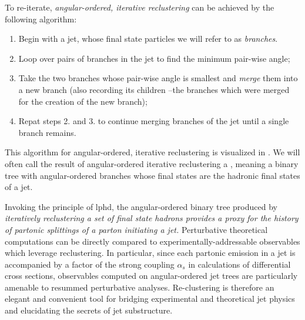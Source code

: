 To re-iterate, \textit{angular-ordered, iterative \gls{reclustering}} can be achieved by the following algorithm:
\begin{enumerate}
    \item
    Begin with a jet, whose final state particles we will refer to as \emph{branches}.

    \item
    Loop over pairs of branches in the jet to find the minimum pair-wise angle;

    \item
    Take the two branches whose pair-wise angle is smallest and \emph{merge} them into a new branch (also recording its children --the branches which were merged for the creation of the new branch);

    \item
    Repat steps 2. and 3. to continue merging branches of the jet until a single branch remains.
\end{enumerate}
%
This algorithm for angular-ordered, iterative \gls{reclustering} is visualized in .
%
We will often call the result of angular-ordered iterative \gls{reclustering} a , meaning a binary tree with angular-ordered branches whose final states are the hadronic final states of a jet.

\begin{figure}[]
    \centering
    \caption{
    }
    \label{fig:reclustering}
\end{figure}





Invoking the principle of \gls{lphd}, the angular-ordered binary tree produced by \textit{iteratively \gls{reclustering} a set of final state hadrons provides a proxy for the history of partonic splittings of a parton initiating a jet.}
%
Perturbative theoretical computations can be directly compared to experimentally-addressable observables which leverage \gls{reclustering}.
%
In particular, since each partonic emission in a jet is accompanied by a factor of the strong coupling \(\alpha_s\) in calculations of differential cross sections, observables computed on angular-ordered jet trees are particularly amenable to resummed perturbative analyses.
%
Re-clustering is therefore an elegant and convenient tool for bridging experimental and theoretical jet physics and elucidating the secrets of jet substructure.

